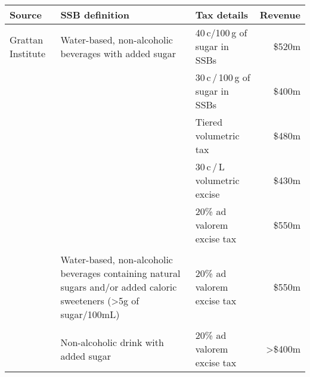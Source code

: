 \bgroup
\def\arraystretch{1.5}
\def\rowSpace{-4pt}
\begin{tabularx}{\columnwidth}{p{2.5cm}X>{\raggedright}p{2.6cm}r}
\toprule
\textbf{Source  } & \textbf{SSB definition} & \textbf{Tax details} & \textbf{Revenue} \\ 
\midrule
Grattan Institute & Water-based, non-alcoholic beverages with added sugar & 40\,c/100\,g of sugar in SSBs & \$520m \\
 &  & 30\,c\,/\,100\,g of sugar in SSBs        & \$400m \\
 &  & Tiered volumetric tax                & \$480m \\
 &  & 30\,c\,/\,L volumetric excise & \$430m \\
 &  & 20\% ad valorem excise tax           & \$550m \\
 & & & \\[\rowSpace]
\textcite{Office2016PolicycostingAustralian} & Water-based, non-alcoholic beverages containing natural sugars and/or added caloric sweeteners (\textgreater{}5g of sugar/100mL)  & 20\% ad valorem excise tax & \$550m \\
& & & \\[\rowSpace]
\textcite{Veerman2016ImpactTaxSugar} & Non-alcoholic drink with added sugar & 20\% ad valorem excise tax& \textgreater{}\$400m \\
\bottomrule
\end{tabularx}
\egroup